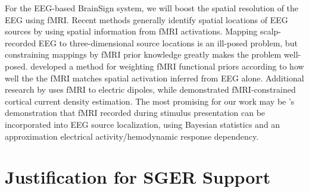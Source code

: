 \documentclass{proposal}
\begin{document}
For the EEG-based BrainSign system, we will boost the spatial resolution of the EEG using fMRI. Recent methods generally identify spatial locations of EEG sources by using spatial information from fMRI activations. Mapping scalp-recorded EEG to three-dimensional source locations is an ill-posed problem, but constraining mappings by fMRI prior knowledge greatly makes the problem well-posed. \cite{im2006tcm} developed a method for weighting fMRI functional priors according to how well the the fMRI matches spatial activation inferred from EEG alone. Additional research by \cite{ahlfors1999sac} uses fMRI to electric dipoles, while \cite{wagner2000fcd} demonstrated fMRI-constrained cortical current density estimation. The most promising for our work may be \cite{dale2000dsp}'s demonstration that fMRI recorded during stimulus presentation can be incorporated into EEG source localization, using Bayesian statistics and an approximation electrical activity/hemodynamic response dependency.




\section{Justification for SGER Support}
\end{document}
